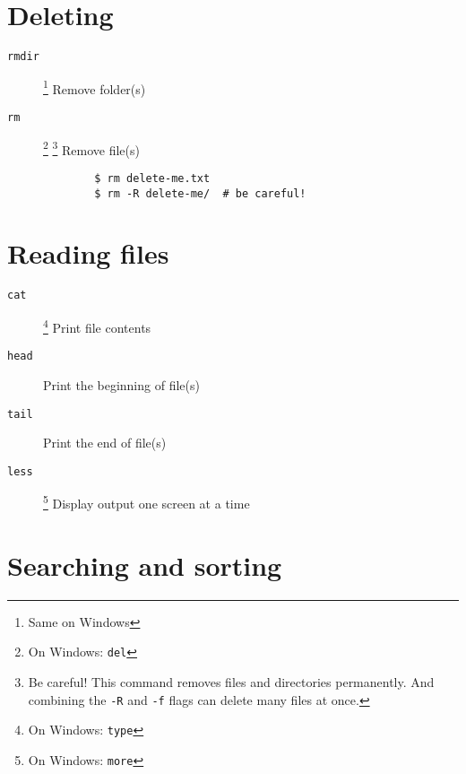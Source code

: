 \documentclass[a4paper]{tufte-handout}
\begin{document}
\section{Deleting}

\begin{description}
    \item [\texttt{rmdir}]
        \footnote{Same on Windows}
        \hfill Remove folder(s)
    \item [\texttt{rm}]
        \footnote{On Windows: \texttt{del}}
        \footnote{Be careful! This command removes files and directories
        permanently. And combining the \texttt{-R} and \texttt{-f} flags can
        delete many files at once.}
        \hfill Remove file(s)
        \begin{verbatim}
        $ rm delete-me.txt
        $ rm -R delete-me/  # be careful!
        \end{verbatim}
\end{description}

\hrulefill{}

\section{Reading files}

\begin{description}
    \item [\texttt{cat}]
        \footnote{On Windows: \texttt{type}}
        \hfill Print file contents
    \item [\texttt{head}]
        \hfill Print the beginning of file(s)
    \item [\texttt{tail}]
        \hfill Print the end of file(s)
    \item[\texttt{less}]
        \footnote{On Windows: \texttt{more}}
        \hfill Display output one screen at a time
\end{description}

\hrulefill{}

\section{Searching and sorting}
\end{document}
